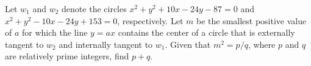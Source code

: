 Let $w_{1}$ and $w_{2}$ denote the circles $x^{2}+y^{2}+10x-24y-87=0$ and $x^{2}+y^{2}-10x-24y+153=0$, respectively. Let $m$ be the smallest positive value of $a$ for which the line $y=ax$ contains the center of a circle that is externally tangent to $w_{2}$ and internally tangent to $w_{1}$. Given that $m^{2}=p/q$, where $p$ and $q$ are relatively prime integers, find $p+q$.